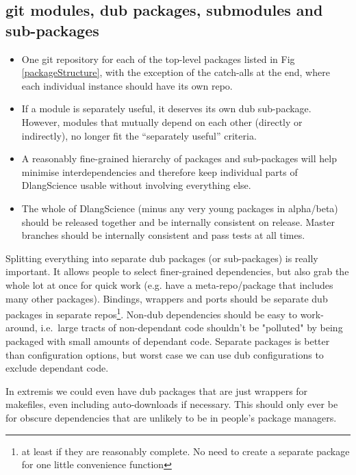 \documentclass[10pt,a5paper,DIV=13]{scrartcl}
\begin{document}
\subsection{git modules, dub packages, submodules and sub-packages}
\begin{itemize}
    \item One git repository for each of the top-level packages listed in Fig \ref{packageStructure}, with the exception of the catch-alls at the end, where each individual instance should have its own repo.
    \item If a module is separately useful, it deserves its own dub sub-package. However, modules that mutually depend on each other (directly or indirectly), no longer fit the ``separately useful'' criteria.
    \item A reasonably fine-grained hierarchy of packages and sub-packages will help minimise interdependencies and therefore keep individual parts of DlangScience usable without involving everything else.
    \item The whole of DlangScience (minus any very young packages in alpha/beta) should be released together and be internally consistent on release. Master branches should be internally consistent and pass tests at all times.
\end{itemize}

Splitting everything into separate dub packages (or sub-packages) is really important. It allows people to select finer-grained dependencies, but also grab the whole lot at once for quick work (e.g. have a meta-repo/package that includes many other packages). Bindings, wrappers and ports should be separate dub packages in separate repos\footnote{at least if they are reasonably complete. No need to create a separate package for one little convenience function}. Non-dub dependencies should be easy to work-around, i.e.\ large tracts of non-dependant code shouldn't be "polluted" by being packaged with small amounts of dependant code. Separate packages is better than configuration options, but worst case we can use dub configurations to exclude dependant code.

In extremis we could even have dub packages that are just wrappers for makefiles, even including auto-downloads if necessary. This should only ever be for obscure dependencies that are unlikely to be in people's package managers.
\end{document}
